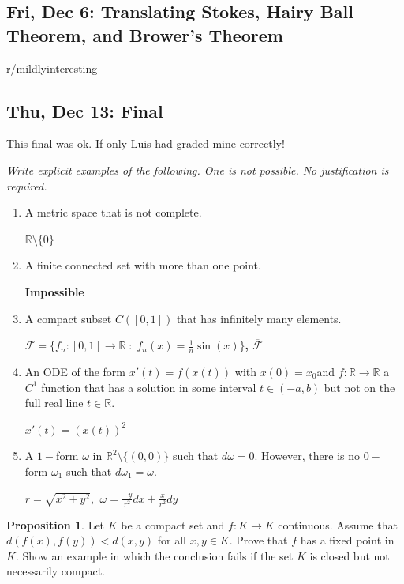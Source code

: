\documentclass[10pt, oneside]{article}
\newcommand{\bbR}{\mathbb{R}}
\theoremstyle{definition}
\newtheorem{prop}{Proposition}
\begin{document}
\subsection{Fri, Dec 6: Translating Stokes, Hairy Ball Theorem, and Brower's Theorem}
r/mildlyinteresting

\subsection{Thu, Dec 13: Final}
This final was ok. If only Luis had graded mine correctly!

\textit{Write explicit examples of the following. One is not possible. No justification is required.}
\begin{enumerate}
    \item A metric space that is not complete.

    \textbf{$\bbR\setminus \{0\}$}
    \item A finite connected set with more than one point.

    \textbf{Impossible}
    \item A compact subset $C([0,1])$ that has infinitely many elements.

    \textbf{$\mathcal{F} = \{f_n: [0,1]\to \bbR \; : \; f_n(x) = \frac{1}{n}\sin(x)\}$, $\boxed{\overline{\mathcal{F}}}$}
    \item An ODE of the form $x'(t) = f(x(t))$ with $x(0) = x_0$and $f: \bbR \to \bbR$ a $C^1$ function that has a solution in some interval $t\in (-a,b)$ but not on the full real line $t\in \bbR.$

    
    \textbf{$x'(t) = (x(t))^2$}
    \item A $1-$form $\omega$ in $\bbR^2\setminus\{(0,0)\}$ such that $d\omega = 0.$ However, there is no $0-$form $\omega_1$ such that $d\omega_1 = \omega.$ 

    
    \textbf{$r = \sqrt{x^2 + y^2},$ $\omega = \frac{-y}{r^2}dx + \frac{x}{r^2}dy$}
\end{enumerate}
\begin{prop}
    Let $K$ be a compact set and $f: K \to K$ continuous. Assume that $d(f(x), f(y))< d(x,y)$ for all $x,y \in K.$ Prove that $f$ has a fixed point in $K.$ Show an example in which the conclusion fails if the set $K$ is closed but not necessarily compact.
\end{prop}
\end{document}
